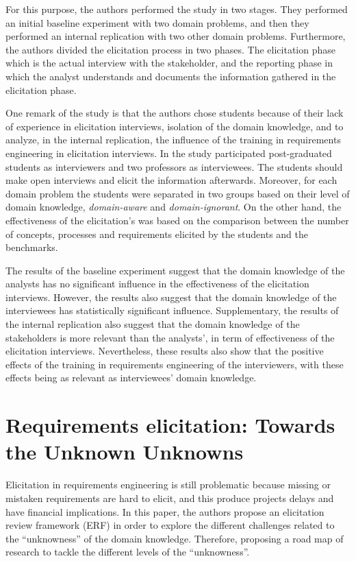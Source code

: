 \documentclass[]{llncs}
\begin{document}
For this purpose, the authors performed the study in two stages. They
performed an initial baseline experiment with two domain problems, and
then they performed an internal replication with two other domain
problems. Furthermore, the authors divided the elicitation process in
two phases. The elicitation phase which is the actual interview with the
stakeholder, and the reporting phase in which the analyst understands
and documents the information gathered in the elicitation phase.

One remark of the study is that the authors chose students because of
their lack of experience in elicitation interviews, isolation of the
domain knowledge, and to analyze, in the internal replication, the
influence of the training in requirements engineering in elicitation
interviews. In the study participated post-graduated students as
interviewers and two professors as interviewees. The students should
make open interviews and elicit the information afterwards. Moreover,
for each domain problem the students were separated in two groups based
on their level of domain knowledge, \emph{domain-aware} and
\emph{domain-ignorant}. On the other hand, the effectiveness of the
elicitation's was based on the comparison between the number of
concepts, processes and requirements elicited by the students and the
benchmarks.

The results of the baseline experiment suggest that the domain knowledge
of the analysts has no significant influence in the effectiveness of the
elicitation interviews. However, the results also suggest that the
domain knowledge of the interviewees has statistically significant
influence. Supplementary, the results of the internal replication also
suggest that the domain knowledge of the stakeholders is more relevant
than the analysts', in term of effectiveness of the elicitation
interviews. Nevertheless, these results also show that the positive
effects of the training in requirements engineering of the interviewers,
with these effects being as relevant as interviewees' domain knowledge.

\hypertarget{requirements-elicitation-towards-the-unknown-unknowns}{%
\section{Requirements elicitation: Towards the Unknown
Unknowns}\label{requirements-elicitation-towards-the-unknown-unknowns}}

Elicitation in requirements engineering is still problematic because
missing or mistaken requirements are hard to elicit, and this produce
projects delays and have financial implications. In this paper, the
authors propose an elicitation review framework (ERF) in order to
explore the different challenges related to the ``unknowness'' of the
domain knowledge. Therefore, proposing a road map of research to tackle
the different levels of the ``unknowness''.
\end{document}
